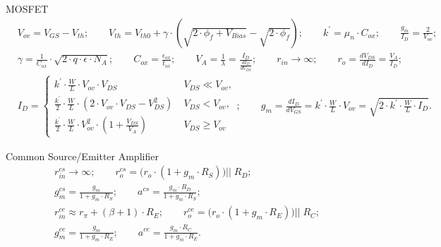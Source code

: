 \documentclass[11pt]{article}
\begin{document}
\begin{sectionbox}{MOSFET}
\begin{align*}
& V_{ov} = V_{GS} - V_{th}; \qquad 
  V_{th} = V_{th0} + \gamma \cdot \left( \sqrt{2 \cdot \phi_f + V_{Bias}} - \sqrt{2 \cdot \phi_f} \right); \qquad 
  k^{\prime} = \mu_n \cdot C_{ox}; \qquad
  \frac{g_m}{I_D} = \frac{2}{V_{ov}}; \\[0.5em]
& \gamma = \frac{1}{C_{ox}} \cdot \sqrt{2 \cdot q \cdot \epsilon \cdot N_A}; \qquad
  C_{ox} = \frac{\epsilon_{ox}}{t_{ox}}; \qquad
  V_A = \frac{1}{\lambda} = \frac{I_D}{\frac{d I_D}{d V_{DS}}}; \qquad %
  r_{in} \rightarrow \infty; \qquad
  r_o = \frac{d V_{DS}}{d I_D} = \frac{V_A}{I_D}; \\[0.5em]
& I_D = \begin{cases}
  k^{\prime} \cdot \frac{W}{L} \cdot V_{ov} \cdot V_{DS} & \; V_{DS} \ll V_{ov},\\[0.5em]
  \frac{k^{\prime}}{2} \cdot \frac{W}{L} \cdot \left(2 \cdot V_{ov} \cdot V_{DS} - V_{DS}^2 \right) & \; V_{DS} < V_{ov},\\[0.5em]
  \frac{k^{\prime}}{2} \cdot \frac{W}{L} \cdot V_{ov}^2 \cdot \left(1 + \frac{V_{DS}}{V_A}\right) & \; V_{DS} \geq V_{ov}
  \end{cases}; \qquad
  g_m = \frac{d I_D}{d V_{GS}} = k^{\prime} \cdot \frac{W}{L} \cdot V_{ov} = \sqrt{2 \cdot k^{\prime} \cdot \frac{W}{L} \cdot I_D}.
\end{align*}
\end{sectionbox}

\begin{sectionbox}{Common Source/Emitter Amplifier}
\begin{align*}
& r_{in}^{cs} \rightarrow \infty; \qquad 
  r_{o}^{cs} = \Big(r_o \cdot (1 + g_m \cdot R_S) \Big) \Big|\Big| \; R_D; \\[0.5em]
& g_m^{cs} = \frac{g_m}{1 + g_m \cdot R_S}; \qquad
  a^{cs} = \frac{g_m \cdot R_D}{1 + g_m \cdot R_S}; \\[2em]
& r_{in}^{ce} \approx r_{\pi} + (\beta + 1) \cdot R_E; \qquad
  r_o^{ce} = \Big(r_o \cdot (1 + g_m \cdot R_E) \Big) \Big|\Big| \; R_C; \\[0.5em]
& g_m^{ce} = \frac{g_m}{1 + g_m \cdot R_E}; \qquad
  a^{ce} = \frac{g_m \cdot R_C}{1 + g_m \cdot R_E}.
\end{align*}
\end{sectionbox}
\end{document}
